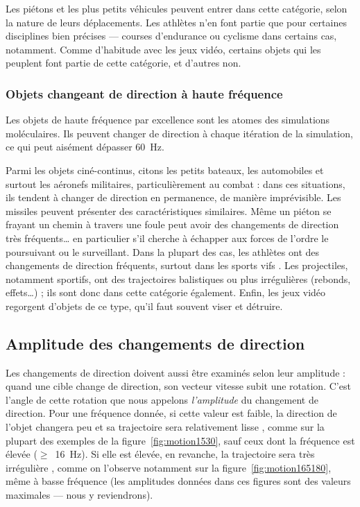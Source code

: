 	Les piétons et les plus petits véhicules peuvent entrer dans cette catégorie, selon la nature de leurs déplacements. Les athlètes n'en font partie que pour certaines disciplines bien précises --- courses d'endurance ou cyclisme dans certains cas, notamment. Comme d'habitude avec les jeux vidéo, certains objets qui les peuplent font partie de cette catégorie, et d'autres non.
	
	\subsubsection{Objets changeant de direction à haute fréquence}	
	Les objets de haute fréquence par excellence sont les atomes des simulations moléculaires. Ils peuvent changer de direction à chaque itération de la simulation, ce qui peut aisément dépasser 60~Hz.
	
	Parmi les objets ciné-continus, citons les petits bateaux, les automobiles et surtout les aéronefs militaires, particulièrement au combat : dans ces situations, ils tendent à changer de direction en permanence, de manière imprévisible. Les missiles peuvent présenter des caractéristiques similaires. Même un piéton se frayant un chemin à travers une foule peut avoir des changements de direction très fréquents\ldots{} en particulier s'il cherche à échapper aux forces de l'ordre le poursuivant ou le surveillant. Dans la plupart des cas, les athlètes ont des changements de direction fréquents, surtout dans les sports \og vifs \fg{}. Les projectiles, notamment sportifs, ont des trajectoires balistiques ou plus irrégulières (rebonds, effets\ldots{}) ; ils sont donc dans cette catégorie également. Enfin, les jeux vidéo regorgent d'objets de ce type, qu'il faut souvent viser et détruire.
	
	\subsection{Amplitude des changements de direction}
	Les changements de direction doivent aussi être examinés selon leur amplitude : quand une cible change de direction, son vecteur vitesse subit une rotation. C'est l'angle de cette rotation que nous appelons \emph{l'amplitude} du changement de direction. Pour une fréquence donnée, si cette valeur est faible, la direction de l'objet changera peu et sa trajectoire sera relativement \og lisse \fg{}, comme sur la plupart des exemples de la figure~\ref{fig:motion1530}, sauf ceux dont la fréquence est élevée ($\geq$~16~Hz). Si elle est élevée, en revanche, la trajectoire sera très \og irrégulière \fg{}, comme on l'observe notamment sur la figure~\ref{fig:motion165180}, même à basse fréquence (les amplitudes données dans ces figures sont des valeurs maximales --- nous y reviendrons).
	
